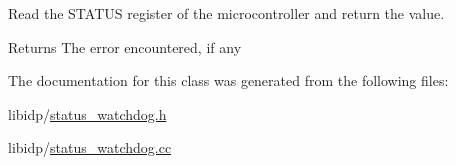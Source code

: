 Read the STATUS register of the microcontroller and return the value. 

\begin{DoxyReturn}{Returns}
The error encountered, if any 
\end{DoxyReturn}


The documentation for this class was generated from the following files:\begin{DoxyCompactItemize}
\item 
libidp/\hyperlink{status__watchdog_8h}{status\_\-watchdog.h}\item 
libidp/\hyperlink{status__watchdog_8cc}{status\_\-watchdog.cc}\end{DoxyCompactItemize}
